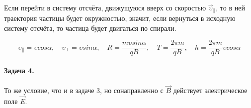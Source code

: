 \documentclass[dvipdfmx]{article}
\begin{document}
\noindent{}
\paragraph{}

Если перейти в систему отсчёта, движущуюся вверх со скоростью $\vec{\upsilon}_\parallel$, то в ней траектория частицы
будет окружностью, значит, если вернуться в исходную систему отсчёта, то частица будет двигаться по спирали.

\begin{equation*}
  \upsilon_\parallel = \upsilon cos\alpha, \quad \upsilon_\perp = \upsilon sin\alpha,
  \quad R = \frac{m\upsilon sin\alpha}{qB}, \quad T = \frac{2\pi m}{qB}, \quad h = \frac{2\pi m}{qB} \upsilon cos\alpha
\end{equation*}

\paragraph{Задача 4.}

То же условие, что и в задаче 3, но сонаправленно с $\vec{B}$ действует электрическое поле $\vec{E}$.
\end{document}
